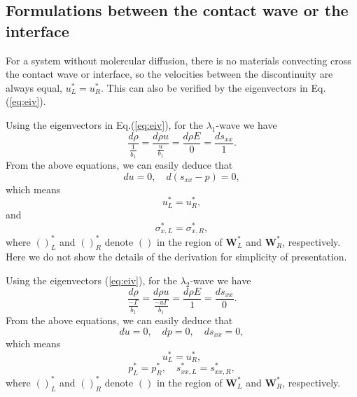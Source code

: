 \documentclass{article}
\numberwithin{equation}{section}
\numberwithin{table}{section}
\begin{document}
\subsection{Formulations between the  contact wave or the interface}
  For  a  system without molercular diffusion, there is no materials convecting  cross the contact wave or interface, so the velocities between the discontinuity are always equal, $u_L^* = u_R^*$. This can also be verified by the eigenvectors  in Eq.(\ref{eq:eiv}).

  Using the eigenvectors in  Eq.(\ref{eq:eiv}), for the $\lambda_{1}$-wave we
have
\begin{equation}   \label{e23a}
\frac{d \rho}{\frac{1}{b_{1}}} = \frac{d \rho u}{\frac{u
}{b_{1}}}=\frac{d \rho E}{0} = \frac{d s_{xx}}{1}.
\end{equation}
From the above equations, we can easily deduce that
\begin{equation}   \label{e23b}
du = 0, \quad d(s_{xx}-p)=0,
\end{equation}
 which means
\begin{equation}   \label{e23c}
  u_{L}^{\ast}=u_{R}^{\ast},
\end{equation}
and
\begin{equation}   \label{e23d}
\sigma_{x,L}^{\ast}=\sigma_{x,R}^{\ast},
\end{equation}
where $()_{L}^{\ast}$ and $()_{R}^{\ast}$ denote $()$ in the region
of $\mathbf{W}_{L}^{\ast}$ and $\mathbf{W}_{R}^{\ast}$,
respectively. Here we do not show the details of the derivation for
simplicity of presentation.


Using the eigenvectors (\ref{eq:eiv}), for the $\lambda_{2}$-wave we
have
\begin{equation}   \label{e24a}
\frac{d \rho}{\frac{-\Gamma}{b_{1}}} = \frac{d \rho u}{\frac{-u
\Gamma}{b_{1}}}=\frac{d \rho E}{1} = \frac{d s_{xx}}{0}.
\end{equation}
From the above equations, we can easily deduce  that
\begin{equation}   \label{e24b}
du = 0, \quad dp=0, \quad ds_{xx}=0,
\end{equation}
 which means
\begin{equation}   \label{e24c}
  u_{L}^{\ast}=u_{R}^{\ast},
\end{equation}
\begin{equation}   \label{e24d}
p_{L}^{\ast}=p_{R}^{\ast}, \quad
  s_{xx,L}^{\ast}=s_{xx,R}^{\ast},
\end{equation}
where $()_{L}^{\ast}$ and $()_{R}^{\ast}$ denote $()$ in the region
of $\mathbf{W}_{L}^{\ast}$ and $\mathbf{W}_{R}^{\ast}$,
respectively.
\end{document}
